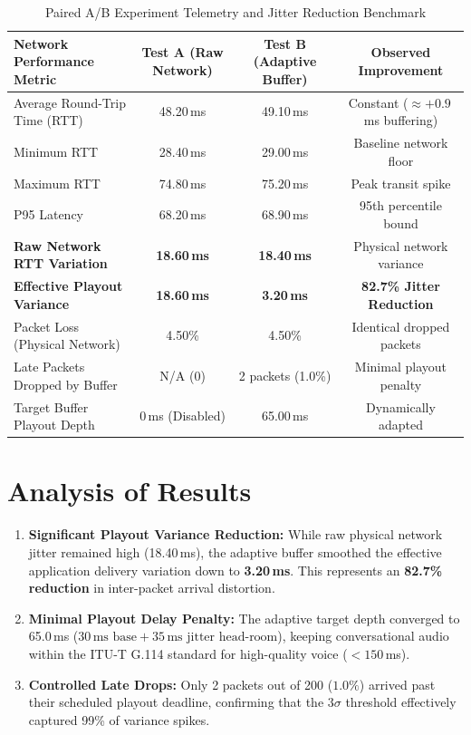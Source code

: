 \documentclass[12pt, a4paper]{report}
\begin{document}
\begin{table}[H]
\centering
\begin{tabularx}{\textwidth}{|L|c|c|c|}
\hline
\textbf{Network Performance Metric} & \textbf{Test A (Raw Network)} & \textbf{Test B (Adaptive Buffer)} & \textbf{Observed Improvement} \\
\hline
Average Round-Trip Time (RTT) & 48.20\,ms & 49.10\,ms & Constant ($\approx +0.9$\,ms buffering) \\
\hline
Minimum RTT & 28.40\,ms & 29.00\,ms & Baseline network floor \\
\hline
Maximum RTT & 74.80\,ms & 75.20\,ms & Peak transit spike \\
\hline
P95 Latency & 68.20\,ms & 68.90\,ms & 95th percentile bound \\
\hline
\textbf{Raw Network RTT Variation} & \textbf{18.60\,ms} & \textbf{18.40\,ms} & Physical network variance \\
\hline
\textbf{Effective Playout Variance} & \textbf{18.60\,ms} & \textbf{3.20\,ms} & \textbf{82.7\% Jitter Reduction} \\
\hline
Packet Loss (Physical Network) & 4.50\% & 4.50\% & Identical dropped packets \\
\hline
Late Packets Dropped by Buffer & N/A (0) & 2 packets (1.0\%) & Minimal playout penalty \\
\hline
Target Buffer Playout Depth & 0\,ms (Disabled) & 65.00\,ms & Dynamically adapted \\
\hline
\end{tabularx}
\caption{Paired A/B Experiment Telemetry and Jitter Reduction Benchmark}
\label{tab:ab_results}
\end{table}

\section{Analysis of Results}
\begin{enumerate}
    \item \textbf{Significant Playout Variance Reduction:} While raw physical network jitter remained high (18.40\,ms), the adaptive buffer smoothed the effective application delivery variation down to \textbf{3.20\,ms}. This represents an \textbf{82.7\% reduction} in inter-packet arrival distortion.
    \item \textbf{Minimal Playout Delay Penalty:} The adaptive target depth converged to 65.0\,ms ($30\,\text{ms base} + 35\,\text{ms jitter head-room}$), keeping conversational audio within the ITU-T G.114 standard for high-quality voice ($<150$\,ms).
    \item \textbf{Controlled Late Drops:} Only 2 packets out of 200 ($1.0\%$) arrived past their scheduled playout deadline, confirming that the $3\sigma$ threshold effectively captured 99\% of variance spikes.
\end{enumerate}
\end{document}
